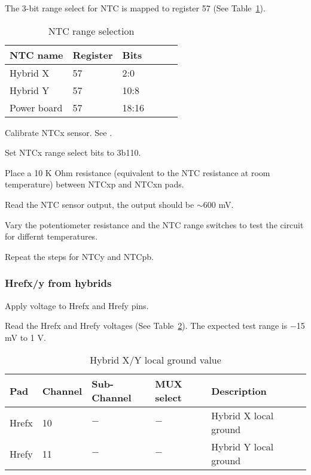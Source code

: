 \documentclass[11pt]{article}   			%
\begin{document}
The 3-bit range select for NTC is mapped to register 57 (See Table~\ref{tab:ntcrange}).
\begin{table}[h]
  \begin{center}
\begin{tabular}{|l|l|l|l|l|l|}
\hline
{\bf NTC name} & {\bf Register} & {\bf Bits}\\
\hline
Hybrid X & 57 & 2:0\\
\hline
Hybrid Y & 57 & 10:8\\
\hline
Power board & 57 & 18:16\\
\hline
\end{tabular}
\caption{NTC range selection}
\label{tab:ntcrange}
\end{center}
\end{table}

\begin{compactitem}
    \item{Calibrate NTCx sensor. See \cite{AMACv2Calib}.}
    \item{Set NTCx range select bits to 3b110.}
    \item{Place a 10 K Ohm resistance (equivalent to the NTC resistance at room temperature) between NTCxp and NTCxn pads.}
    \item{Read the NTC sensor output, the output should be $\sim$600 mV.}
    \item{Vary the potentiometer resistance and the NTC range switches to test the circuit for differnt temperatures.}
    \item{Repeat the steps for NTCy and NTCpb.}
\end{compactitem}

\subsubsection{Hrefx/y from hybrids}
\begin{compactitem}
\item{Apply voltage to Hrefx and Hrefy pins.}
\item{Read the Hrefx and Hrefy voltages (See Table~\ref{tab:href}). The expected test range is $-$15 mV to 1 V.}
\end{compactitem}
\begin{table}[h]
  \begin{center}
\begin{tabular}{|l|l|l|l|l|l|}
\hline
{\bf Pad} & {\bf Channel} & {\bf Sub-Channel} & {\bf MUX select} & {\bf Description}\\
\hline
Hrefx & 10 & $-$ & $-$ & Hybrid X local ground\\
\hline
Hrefy & 11 & $-$ & $-$ & Hybrid Y local ground\\
\hline
\end{tabular}
\caption{Hybrid X/Y local ground value}
\label{tab:href}
\end{center}
\end{table}
\end{document}
